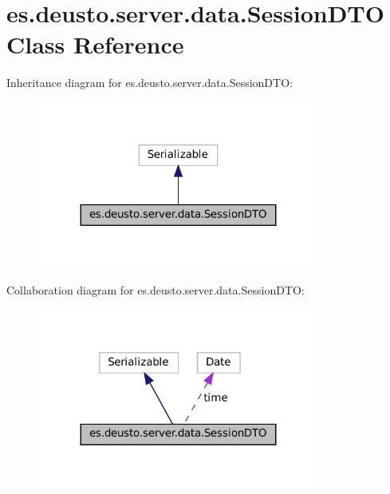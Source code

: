 \hypertarget{classes_1_1deusto_1_1server_1_1data_1_1_session_d_t_o}{}\section{es.\+deusto.\+server.\+data.\+Session\+D\+TO Class Reference}
\label{classes_1_1deusto_1_1server_1_1data_1_1_session_d_t_o}


Inheritance diagram for es.\+deusto.\+server.\+data.\+Session\+D\+TO\+:
\nopagebreak
\begin{figure}[H]
\begin{center}
\leavevmode
\includegraphics[width=263pt]{classes_1_1deusto_1_1server_1_1data_1_1_session_d_t_o__inherit__graph}
\end{center}
\end{figure}


Collaboration diagram for es.\+deusto.\+server.\+data.\+Session\+D\+TO\+:
\nopagebreak
\begin{figure}[H]
\begin{center}
\leavevmode
\includegraphics[width=263pt]{classes_1_1deusto_1_1server_1_1data_1_1_session_d_t_o__coll__graph}
\end{center}
\end{figure}
